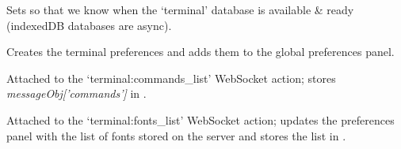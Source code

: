 \documentclass[letterpaper,10pt,openany]{sphinxmanual}
\begin{document}

\begin{fulllineitems}
\label{Applications/terminal/js_terminal:GateOne.Terminal.dbReady}
Sets  so that we know when the `terminal' database is available \& ready (indexedDB databases are async).

\end{fulllineitems}


\begin{fulllineitems}
\label{Applications/terminal/js_terminal:GateOne.Terminal.createPrefsPanel}
Creates the terminal preferences and adds them to the global preferences panel.

\end{fulllineitems}


\begin{fulllineitems}
\label{Applications/terminal/js_terminal:GateOne.Terminal.enumerateCommandsAction}
Attached to the `terminal:commands\_list' WebSocket action; stores \emph{messageObj{[}'commands'{]}} in .

\end{fulllineitems}


\begin{fulllineitems}
\label{Applications/terminal/js_terminal:GateOne.Terminal.enumerateFontsAction}
Attached to the `terminal:fonts\_list' WebSocket action; updates the preferences panel with the list of fonts stored on the server and stores the list in .

\end{fulllineitems}

\end{document}
